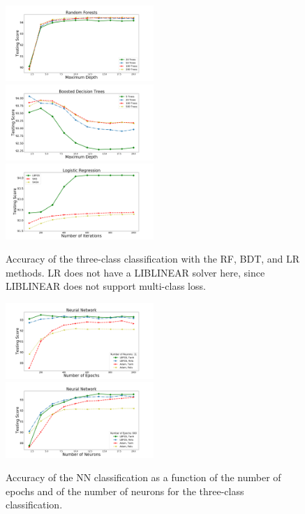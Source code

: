 \documentclass[referee]{aa} %
\begin{document}
\begin{figure}[h]
\centering
\includegraphics[width=0.5\textwidth]{plots/rf_train_multi.pdf}\\
\includegraphics[width=0.5\textwidth]{plots/bdt_train_multi.pdf}
\includegraphics[width=0.5\textwidth]{plots/lr_train_multi.pdf}
\caption{Accuracy of the three-class classification with the RF, BDT, and LR  methods. LR does not have a LIBLINEAR solver here, since LIBLINEAR 
does not support multi-class loss.
}
\label{fig:tree_multi}
\end{figure}

\begin{figure}[h]
\centering
\includegraphics[width=0.5\textwidth]{plots/nn_epoch_train_multi.pdf}\\
\includegraphics[width=0.5\textwidth]{plots/nn_neuron_train_multi.pdf}
\caption{Accuracy of the NN classification as a function of the number of epochs and of the number of neurons
 for the three-class classification. 
 }
\label{fig:nets_multi}
\end{figure}
\end{document}
